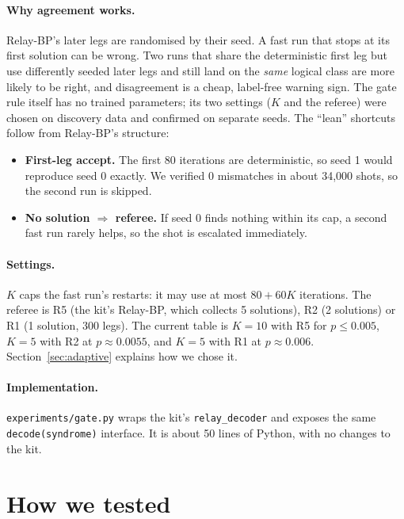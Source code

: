\documentclass[11pt]{article}
\begin{document}
\paragraph{Why agreement works.} Relay-BP's later legs are randomised by their seed. A fast run that stops at its first
solution can be wrong. Two runs that share the deterministic first leg but use differently seeded later legs and still land on the \emph{same} logical class are
more likely to be right, and disagreement is a cheap, label-free warning sign. The gate rule itself has no trained parameters; its two settings ($K$ and the referee) were chosen on discovery data and
confirmed on separate seeds. The ``lean'' shortcuts follow from Relay-BP's structure:
\begin{itemize}
  \item \textbf{First-leg accept.} The first 80 iterations are deterministic, so seed 1 would reproduce seed 0 exactly.
        We verified 0 mismatches in about 34,000 shots, so the second run is skipped.
  \item \textbf{No solution $\Rightarrow$ referee.} If seed 0 finds nothing within its cap, a second fast run rarely
        helps, so the shot is escalated immediately.
\end{itemize}

\paragraph{Settings.} $K$ caps the fast run's restarts: it may use at most $80 + 60K$ iterations. The referee is
R5 (the kit's Relay-BP, which collects 5 solutions), R2 (2 solutions) or R1 (1 solution, 300 legs). The current table is
$K=10$ with R5 for $p \le 0.005$, $K=5$ with R2 at $p\approx0.0055$, and $K=5$ with R1 at $p\approx0.006$.
Section~\ref{sec:adaptive} explains how we chose it.

\paragraph{Implementation.} \texttt{experiments/gate.py} wraps the kit's \texttt{relay\_decoder} and exposes the same
\texttt{decode(syndrome)} interface. It is about 50 lines of Python, with no changes to the kit.

\section{How we tested}\label{sec:method}
\end{document}
